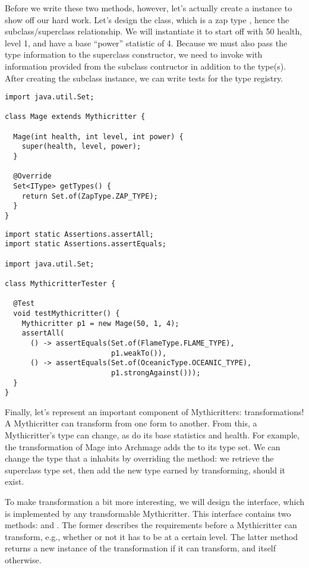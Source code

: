 Before we write these two methods, however, let's actually create a  instance to show off our hard work. 
Let's design the  class, which is a zap type , hence the subclass/superclass relationship. 
We will instantiate it to start off with 50 health, level 1, and have a base ``power'' statistic of 4. 
Because we must also pass the type information to the superclass constructor, we need to invoke  with information provided from the subclass contructor in addition to the type(s). 
After creating the subclass instance, we can write tests for the type registry. 

\begin{lstlisting}[language=MyJava]
import java.util.Set;

class Mage extends Mythicritter {

  Mage(int health, int level, int power) {
    super(health, level, power);
  }

  @Override
  Set<IType> getTypes() {
    return Set.of(ZapType.ZAP_TYPE);
  }
}
\end{lstlisting}

\begin{lstlisting}[language=MyJava]
import static Assertions.assertAll;
import static Assertions.assertEquals;

import java.util.Set;

class MythicritterTester {

  @Test
  void testMythicritter() {
    Mythicritter p1 = new Mage(50, 1, 4);
    assertAll(
      () -> assertEquals(Set.of(FlameType.FLAME_TYPE),
                         p1.weakTo()),
      () -> assertEquals(Set.of(OceanicType.OCEANIC_TYPE),
                         p1.strongAgainst()));
  }
}
\end{lstlisting}

Finally, let's represent an important component of Mythicritters: transformations! A Mythicritter can transform from one form to another. 
From this, a Mythicritter's type can change, as do its base statistics and health. 
For example, the transformation of Mage into Archmage adds the  to its type set. 
We can change the type that a  inhabits by overriding the  method: we retrieve the superclass type set, then add the new type earned by transforming, should it exist.

To make transformation a bit more interesting, we will design the  interface, which is implemented by any transformable Mythicritter. 
This interface contains two methods:  and . 
The former describes the requirements before a Mythicritter can transform, e.g., whether or not it has to be at a certain level. 
The latter  method returns a new instance of the transformation if it can transform, and itself otherwise. 

